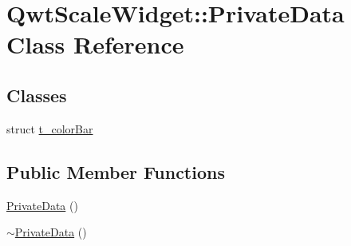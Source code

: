 \hypertarget{class_qwt_scale_widget_1_1_private_data}{\section{Qwt\-Scale\-Widget\-:\-:Private\-Data Class Reference}
\label{class_qwt_scale_widget_1_1_private_data}
}
\subsection*{Classes}
\begin{DoxyCompactItemize}
\item 
struct \hyperlink{struct_qwt_scale_widget_1_1_private_data_1_1t__color_bar}{t\-\_\-color\-Bar}
\end{DoxyCompactItemize}
\subsection*{Public Member Functions}
\begin{DoxyCompactItemize}
\item 
\hyperlink{class_qwt_scale_widget_1_1_private_data_a5901bb797dbdc06c624d2f6f0a36cfff}{Private\-Data} ()
\item 
\hyperlink{class_qwt_scale_widget_1_1_private_data_a02e917fde091105129ecc90bd2f20516}{$\sim$\-Private\-Data} ()
\end{DoxyCompactItemize}
